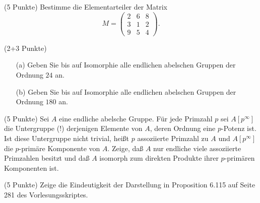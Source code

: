 \documentclass{algsheet}
\author{Dipl.-Math.~Franz Vogler}
\date{30.~Mai 2011}
\begin{document}
                \maketitle



\begin{exercise}(5 Punkte)\newline
    Bestimme die Elementarteiler der Matrix
    \begin{equation}
      M =  \begin{pmatrix}
            2 & 6 & 8 \\
            3 & 1 & 2 \\
            9 & 5 & 4
        \end{pmatrix}.
    \end{equation}
\end{exercise}

\begin{exercise}(2+3 Punkte)\vspace{-1ex}
   \begin{itemize}
    \item [(a)] Geben Sie bis auf Isomorphie alle endlichen abelschen Gruppen der Ordnung
    \(24\) an.
    \item [(b)] Geben Sie bis auf Isomorphie alle endlichen abelschen Gruppen der Ordnung
    \(180\) an.
   \end{itemize}
\end{exercise}



\begin{exercise}(5 Punkte)\newline
    Sei \(A\) eine endliche abelsche Gruppe. Für jede Primzahl \(p\) sei
    \(A[p^\infty]\) die Untergruppe (!) derjenigen Elemente von \(A\), deren
    Ordnung eine \(p\)-Potenz ist. Ist diese Untergruppe nicht trivial, heißt \(p\)
    assoziierte Primzahl zu \(A\) und \(A[p^\infty]\) die \(p\)-primäre
    Komponente von \(A\). Zeige, daß \(A\) nur endliche viele assoziierte Primzahlen
    besitzt und daß \(A\) isomorph zum direkten Produkte ihrer \(p\)-primären
    Komponenten ist.
\end{exercise}

\begin{exercise}(5 Punkte)\newline
    Zeige die Eindeutigkeit der Darstellung in Proposition 6.115 auf Seite 281 des Vor\-lesungsskriptes.
\end{exercise}
\end{document}

